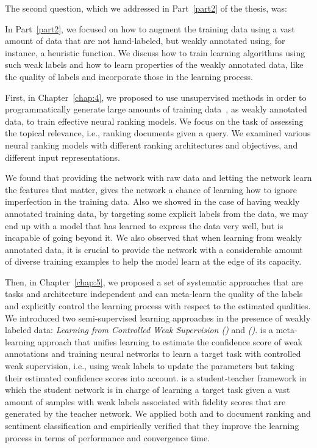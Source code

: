 \bigskip
The second question, which we addressed in Part~\ref{part2} of the thesis, was:
%

In Part~\ref{part2}, we focused on how to augment the training data using a vast amount of data that are not hand-labeled, but weakly annotated using, for instance, a heuristic function. We discuss how to train learning algorithms using such weak labels and how to learn properties of the weakly annotated data, like the quality of labels and incorporate those in the learning process.  

First, in Chapter~\ref{chap:4}, we proposed to use unsupervised methods in order to programmatically generate large amounts of training data~\citep{Ratner:2016}, as weakly annotated data, to train effective neural ranking models. We focus on the task of assessing the topical relevance, i.e., ranking documents given a query. We examined various neural ranking models with different ranking architectures and objectives, and different input representations.

We found that providing the network with raw data and letting the network learn the features that matter, gives the network a chance of learning how to ignore imperfection in the training data. Also we showed in the case of having weakly annotated training data, by targeting some explicit labels from the data, we may end up with a model that has learned to express the data very well, but is incapable of going beyond it. We also observed that when learning from weakly annotated data, it is crucial to provide the network with a considerable amount of diverse training examples to help the model learn at the edge of its capacity.

Then, in Chapter~\ref{chap:5}, we proposed a set of systematic approaches that are tasks and architecture independent and can meta-learn the quality of the labels and explicitly control the learning process with respect to the estimated qualities. We introduced two semi-supervised learning approaches in the presence of weakly labeled data: \emph{Learning from Controlled Weak Supervision (\cws)} and \emph{\fwlfulllc (\fwl)}.
\cws is a meta-learning approach that unifies learning to estimate the confidence score of weak annotations and training neural networks to learn a target task with controlled weak supervision, i.e., using weak labels to update the parameters but taking their estimated confidence scores into account. \fwl is a student-teacher framework in which the student network is in charge of learning a target task given a vast amount of samples with weak labels associated with fidelity scores that are generated by the teacher network.  We applied both \cws and \fwl to document ranking and sentiment classification and empirically verified that they improve the learning process in terms of performance and convergence time. 

